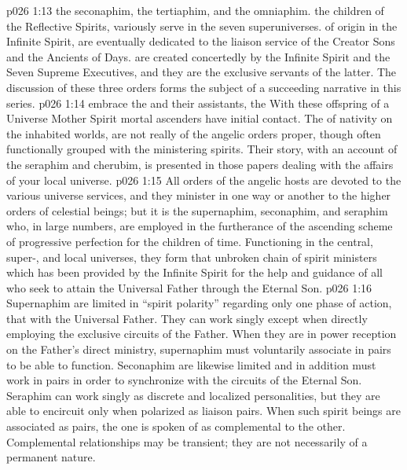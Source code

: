 \vs p026 1:13 \bibnobreakspace {} the seconaphim, the tertiaphim, and the omniaphim.  the children of the Reflective Spirits, variously serve in the seven superuniverses.  of origin in the Infinite Spirit, are eventually dedicated to the liaison service of the Creator Sons and the Ancients of Days.  are created concertedly by the Infinite Spirit and the Seven Supreme Executives, and they are the exclusive servants of the latter. The discussion of these three orders forms the subject of a succeeding narrative in this series.
\vs p026 1:14 \bibnobreakspace {} embrace the  and their assistants, the  With these offspring of a Universe Mother Spirit mortal ascenders have initial contact. The  of nativity on the inhabited worlds, are not really of the angelic orders proper, though often functionally grouped with the ministering spirits. Their story, with an account of the seraphim and cherubim, is presented in those papers dealing with the affairs of your local universe.
\vs p026 1:15 \pc All orders of the angelic hosts are devoted to the various universe services, and they minister in one way or another to the higher orders of celestial beings; but it is the supernaphim, seconaphim, and seraphim who, in large numbers, are employed in the furtherance of the ascending scheme of progressive perfection for the children of time. Functioning in the central, super-, and local universes, they form that unbroken chain of spirit ministers which has been provided by the Infinite Spirit for the help and guidance of all who seek to attain the Universal Father through the Eternal Son.
\vs p026 1:16 Supernaphim are limited in “spirit polarity” regarding only one phase of action, that with the Universal Father. They can work singly except when directly employing the exclusive circuits of the Father. When they are in power reception on the Father’s direct ministry, supernaphim must voluntarily associate in pairs to be able to function. Seconaphim are likewise limited and in addition must work in pairs in order to synchronize with the circuits of the Eternal Son. Seraphim can work singly as discrete and localized personalities, but they are able to encircuit only when polarized as liaison pairs. When such spirit beings are associated as pairs, the one is spoken of as complemental to the other. Complemental relationships may be transient; they are not necessarily of a permanent nature.
